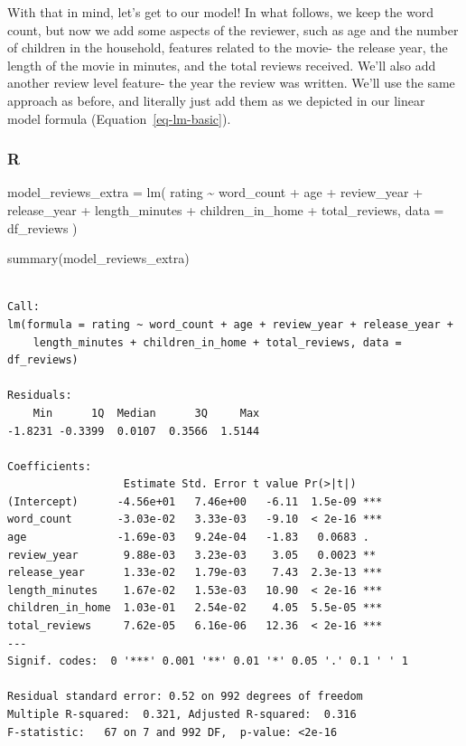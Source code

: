 \documentclass[
  letterpaper,
]{krantz}
\newenvironment{Shaded}{}{}
\newcommand{\AttributeTok}[1]{\textcolor[rgb]{0.49,0.56,0.16}{#1}}
\newcommand{\FunctionTok}[1]{\textcolor[rgb]{0.02,0.16,0.49}{#1}}
\newcommand{\NormalTok}[1]{#1}
\newcommand{\OtherTok}[1]{\textcolor[rgb]{0.00,0.44,0.13}{#1}}
\newcommand{\SpecialCharTok}[1]{\textcolor[rgb]{0.25,0.44,0.63}{#1}}
\begin{document}
With that in mind, let's get to our model! In what follows, we keep the
word count, but now we add some aspects of the reviewer, such as age and
the number of children in the household, features related to the movie-
the release year, the length of the movie in minutes, and the total
reviews received. We'll also add another review level feature- the year
the review was written. We'll use the same approach as before, and
literally just add them as we depicted in our linear model formula
(Equation~\ref{eq-lm-basic}).

\subsubsection{R}

\begin{Shaded}
\begin{Highlighting}[]
\NormalTok{model\_reviews\_extra }\OtherTok{=} \FunctionTok{lm}\NormalTok{(}
\NormalTok{    rating }\SpecialCharTok{\textasciitilde{}}
\NormalTok{        word\_count}
        \SpecialCharTok{+}\NormalTok{ age}
        \SpecialCharTok{+}\NormalTok{ review\_year}
        \SpecialCharTok{+}\NormalTok{ release\_year}
        \SpecialCharTok{+}\NormalTok{ length\_minutes}
        \SpecialCharTok{+}\NormalTok{ children\_in\_home}
        \SpecialCharTok{+}\NormalTok{ total\_reviews,}
    \AttributeTok{data =}\NormalTok{ df\_reviews}
\NormalTok{)}

\FunctionTok{summary}\NormalTok{(model\_reviews\_extra)}
\end{Highlighting}
\end{Shaded}

\begin{verbatim}

Call:
lm(formula = rating ~ word_count + age + review_year + release_year + 
    length_minutes + children_in_home + total_reviews, data = df_reviews)

Residuals:
    Min      1Q  Median      3Q     Max 
-1.8231 -0.3399  0.0107  0.3566  1.5144 

Coefficients:
                  Estimate Std. Error t value Pr(>|t|)    
(Intercept)      -4.56e+01   7.46e+00   -6.11  1.5e-09 ***
word_count       -3.03e-02   3.33e-03   -9.10  < 2e-16 ***
age              -1.69e-03   9.24e-04   -1.83   0.0683 .  
review_year       9.88e-03   3.23e-03    3.05   0.0023 ** 
release_year      1.33e-02   1.79e-03    7.43  2.3e-13 ***
length_minutes    1.67e-02   1.53e-03   10.90  < 2e-16 ***
children_in_home  1.03e-01   2.54e-02    4.05  5.5e-05 ***
total_reviews     7.62e-05   6.16e-06   12.36  < 2e-16 ***
---
Signif. codes:  0 '***' 0.001 '**' 0.01 '*' 0.05 '.' 0.1 ' ' 1

Residual standard error: 0.52 on 992 degrees of freedom
Multiple R-squared:  0.321, Adjusted R-squared:  0.316 
F-statistic:   67 on 7 and 992 DF,  p-value: <2e-16
\end{verbatim}
\end{document}
